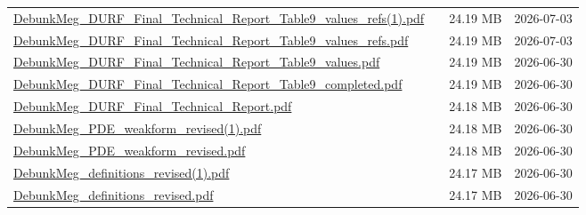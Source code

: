 \documentclass[UTF8,fontset=fandol,10pt,a4paper]{ctexart}
\begin{document}
\begin{longtable}{@{}L{\dimexpr\linewidth-50mm-6\tabcolsep\relax}R{8mm}R{16mm}R{26mm}@{}}
\href{https://chatgpt.com/library?file_id=libfile_26dd4d0052a08191b639543385a547e2&account_id=personal}{DebunkMeg\_\allowbreak{}DURF\_\allowbreak{}Final\_\allowbreak{}Technical\_\allowbreak{}Report\_\allowbreak{}Table9\_\allowbreak{}values\_\allowbreak{}refs(1).\allowbreak{}pdf} & \textemdash{} & 24.19 MB & 2026-07-03 \\
\href{https://chatgpt.com/library?file_id=libfile_bb533660e0988191917d731a0ac20c03&account_id=personal}{DebunkMeg\_\allowbreak{}DURF\_\allowbreak{}Final\_\allowbreak{}Technical\_\allowbreak{}Report\_\allowbreak{}Table9\_\allowbreak{}values\_\allowbreak{}refs.\allowbreak{}pdf} & \textemdash{} & 24.19 MB & 2026-07-03 \\
\href{https://chatgpt.com/library?file_id=libfile_156d37bef75c81919dc3b002005fa80c&account_id=personal}{DebunkMeg\_\allowbreak{}DURF\_\allowbreak{}Final\_\allowbreak{}Technical\_\allowbreak{}Report\_\allowbreak{}Table9\_\allowbreak{}values.\allowbreak{}pdf} & \textemdash{} & 24.19 MB & 2026-06-30 \\
\href{https://chatgpt.com/library?file_id=libfile_fb7b015c78908191bd6d7a7a44c77a16&account_id=personal}{DebunkMeg\_\allowbreak{}DURF\_\allowbreak{}Final\_\allowbreak{}Technical\_\allowbreak{}Report\_\allowbreak{}Table9\_\allowbreak{}completed.\allowbreak{}pdf} & \textemdash{} & 24.19 MB & 2026-06-30 \\
\href{https://chatgpt.com/library?file_id=libfile_22c534bb0c748191ad16d0f9b3f00278&account_id=personal}{DebunkMeg\_\allowbreak{}DURF\_\allowbreak{}Final\_\allowbreak{}Technical\_\allowbreak{}Report.\allowbreak{}pdf} & \textemdash{} & 24.18 MB & 2026-06-30 \\
\href{https://chatgpt.com/library?file_id=libfile_73f1e6e04188819189da55f97134e253&account_id=personal}{DebunkMeg\_\allowbreak{}PDE\_\allowbreak{}weakform\_\allowbreak{}revised(1).\allowbreak{}pdf} & \textemdash{} & 24.18 MB & 2026-06-30 \\
\href{https://chatgpt.com/library?file_id=libfile_8c682f85e0b8819186c7f2bc5c30e7f1&account_id=personal}{DebunkMeg\_\allowbreak{}PDE\_\allowbreak{}weakform\_\allowbreak{}revised.\allowbreak{}pdf} & \textemdash{} & 24.18 MB & 2026-06-30 \\
\href{https://chatgpt.com/library?file_id=libfile_e51758a26e848191a3f89061be324b6c&account_id=personal}{DebunkMeg\_\allowbreak{}definitions\_\allowbreak{}revised(1).\allowbreak{}pdf} & \textemdash{} & 24.17 MB & 2026-06-30 \\
\href{https://chatgpt.com/library?file_id=libfile_0ee2892c30f8819184a462525bb37ef8&account_id=personal}{DebunkMeg\_\allowbreak{}definitions\_\allowbreak{}revised.\allowbreak{}pdf} & \textemdash{} & 24.17 MB & 2026-06-30 \\

\end{longtable}
\end{document}
